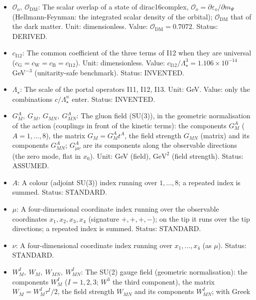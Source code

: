 \documentclass[
  10pt,
]{article}
\begin{document}
\begin{itemize}
  \(f\) and \(n_i\) that of the neutrino mass state \(i\) (per 3-volume
  of four dimensions). Unit: \(\mathrm{GeV}^{7}\) (eight dimensions),
  \(\mathrm{GeV}^{3}\) (four dimensions). Status: STANDARD.
\item
  \(\mathcal{O}_o,\ \mathcal{O}_{\mathrm{DM}}\): The scalar overlap of a
  state of dirac16complex,
  \(\mathcal{O}_o = \partial\varepsilon_o/\partial m_\Psi\)
  (Hellmann-Feynman: the integrated scalar density of the orbital);
  \(\mathcal{O}_{\mathrm{DM}}\) that of the dark matter. Unit:
  dimensionless. Value: \(\mathcal{O}_{\mathrm{DM}} = 0.7072\). Status:
  DERIVED.
\item
  \(c_{\mathrm{I12}}\): The common coefficient of the three terms of I12
  when they are universal
  (\(c_{\mathrm{G}} = c_{\mathrm{W}} = c_{\mathrm{B}} = c_{\mathrm{I12}}\)).
  Unit: dimensionless. Value:
  \(c_{\mathrm{I12}}/\Lambda_\star^3 = 1.106\times10^{-14}\)
  GeV\(^{-3}\) (unitarity-safe benchmark). Status: INVENTED.
\item
  \(\Lambda_\star\): The scale of the portal operators I11, I12, I13.
  Unit: GeV. Value: only the combinations \(c/\Lambda_\star^n\) enter.
  Status: INVENTED.
\item
  \(G^A_M,\ G_M,\ G_{MN},\ G^A_{MN}\): The gluon field (SU(3)), in the
  geometric normalisation of the action (couplings in front of the
  kinetic terms): the components \(G^A_M\) (\(A = 1, \dots, 8\)), the
  matrix \(G_M = G^A_Mt^A\), the field strength \(G_{MN}\) (matrix) and
  its components \(G^A_{MN}\); \(G^A_{\mu\nu}\) are its components along
  the observable directions (the zero mode, flat in \(x_0\)). Unit: GeV
  (field), \(\mathrm{GeV}^{2}\) (field strength). Status: ASSUMED.
\item
  \(A\): A colour (adjoint SU(3)) index running over \(1, \dots, 8\); a
  repeated index is summed. Status: STANDARD.
\item
  \(\mu\): A four-dimensional coordinate index running over the
  observable coordinates \(x_1, x_2, x_3, x_4\) (signature \(+,+,+,-\));
  on the tip it runs over the tip directions; a repeated index is
  summed. Status: STANDARD.
\item
  \(\nu\): A four-dimensional coordinate index running over
  \(x_1, \dots, x_4\) (as \(\mu\)). Status: STANDARD.
\item
  \(W^I_M,\ W_M,\ W_{MN},\ W^I_{MN}\): The SU(2) gauge field (geometric
  normalisation): the components \(W^I_M\) (\(I = 1, 2, 3\); \(W^3\) the
  third component), the matrix \(W_M = W^I_M\tau^I/2\), the field
  strength \(W_{MN}\) and its components \(W^I_{MN}\); with Greek

\end{itemize}
\end{document}
